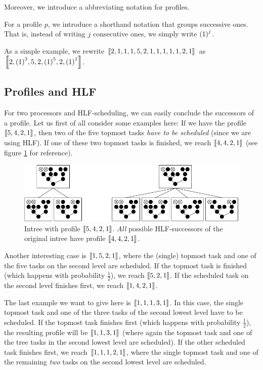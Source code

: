 Moreover, we introduce a abbreviating notation for profiles.

\begin{definition}
  For a profile $p$, we introduce a shorthand notation that groups successive ones. That is, instead of writing $j$ consecutive ones, we simply write ${(1)}^{j}$.
\end{definition}

As a simple example, we rewrite $\left\llbracket 2,1,1,1,5,2,1,1,1,1,1,2,1 \right\rrbracket$ as 
$\left\llbracket 2,{(1)}^{3},5,2,{(1)}^{5},2,{(1)}^{1} \right\rrbracket$.

\subsection{Profiles and HLF}
\label{sec:p2-simple-method-runtime-profiles-hlf}

For two processors and HLF-scheduling, we can easily conclude the successors of a profile. Let us first of all consider some examples here: If we have the profile $\left\llbracket 5,4,2,1 \right\rrbracket$, then two of the five topmost tasks \emph{have to be scheduled} (since we are using HLF). If one of these two topmost tasks is finished, we reach $\left\llbracket 4,4,2,1 \right\rrbracket$ (see figure \ref{fig:p2-profiles-successors-of-5421-always-same} for reference).

\begin{figure}[ht]
  \centering
  \includegraphics{p2/hlf_succs_same_profile.pdf}
  \caption{Intree with profile $\left\llbracket 5,4,2,1 \right\rrbracket$. \emph{All} possible HLF-successors of the original intree have profile $\left\llbracket 4,4,2,1 \right\rrbracket$.}
  \label{fig:p2-profiles-successors-of-5421-always-same}
\end{figure}

Another interesting case is $\left\llbracket 1,5,2,1 \right\rrbracket$, where the (single) topmost task and one of the five tasks on the second level are scheduled. If the topmost task is finished (which happens with probability $\frac{1}{2}$), we reach $\left\llbracket 5,2,1 \right\rrbracket$. If the scheduled task on the second level finishes first, we reach $\left\llbracket 1,4,2,1 \right\rrbracket$.

The last example we want to give here is $\left\llbracket 1,1,1,3,1 \right\rrbracket$. In this case, the single topmost task and one of the three tasks of the second lowest level have to be scheduled. If the topmost task finishes first (which happens with probability $\frac{1}{2}$), the resulting profile will be $\left\llbracket 1,1,3,1 \right\rrbracket$ (where again the topmost task and one of the tree tasks in the second lowest level are scheduled). If the other scheduled task finishes first, we reach $\left\llbracket 1,1,1,2,1 \right\rrbracket$, where the single topmost task and one of the remaining \emph{two} tasks on the second lowest level are scheduled.

